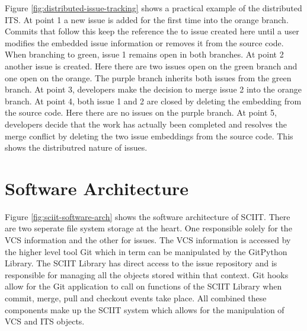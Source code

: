 \documentclass{mproj}
\begin{document}
Figure \ref{fig:distributed-issue-tracking} shows a practical example of the distributed ITS. At point 1 a new issue is added for the first time into the orange branch. Commits that follow this keep the reference the to issue created here until a user modifies the embedded issue information or removes it from the source code. When branching to green, issue 1 remains open in both branches. At point 2 another issue is created. Here there are two issues open on the green branch and one open on the orange. The purple branch inherits both issues from the green branch. At point 3, developers make the decision to merge issue 2 into the orange branch. At point 4, both issue 1 and 2 are closed by deleting the embedding from the source code. Here there are no issues on the purple branch. At point 5, developers decide that the work has actually been completed and resolves the merge conflict by deleting the two issue embeddings from the source code. This shows the distributred nature of issues.







\section{Software Architecture}

Figure \ref{fig:sciit-software-arch} shows the software architecture of SCIIT. There are two seperate file system storage at the heart. One responsible solely for the VCS information and the other for issues. The VCS information is accessed by the higher level tool Git which in term can be manipulated by the GitPython Library. The SCIIT Library has direct access to the issue repository and is responsible for managing all the objects stored within that context. Git hooks allow for the Git application to call on functions of the SCIIT Library when commit, merge, pull and checkout events take place. All combined these components make up the SCIIT system which allows for the manipulation of VCS and ITS objects.
\end{document}
